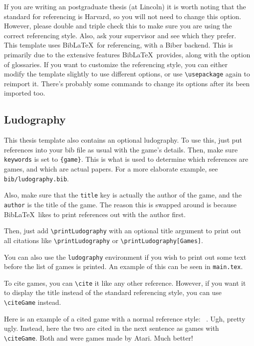 If you are writing an postgraduate thesis (at Lincoln) it is worth noting that the standard for referencing is Harvard, so you will not need to change this option. However, please double and triple check this to make sure you are using the correct referencing style. Also, ask your supervisor and see which they prefer. This template uses Bib\LaTeX~for referencing, with a Biber backend. This is primarily due to the extensive features Bib\LaTeX~provides, along with the option of glossaries. If you want to customize the referencing style, you can either modify the template slightly to use different options, or use \texttt{\textbackslash usepackage} again to reimport it. There's probably some commands to change its options after its been imported too.

\subsection{Ludography}
This thesis template also contains an optional ludography. To use this, just put references into your bib file as usual with the game's details. Then, make sure \texttt{keywords} is set to \texttt{\{game\}}. This is what is used to determine which references are games, and which are actual papers. For a more elaborate example, see \texttt{bib/ludography.bib}.

Also, make sure that the \texttt{title} key is actually the author of the game, and the \texttt{author} is the title of the game. The reason this is swapped around is because Bib\LaTeX~likes to print references out with the author first.

Then, just add \texttt{\textbackslash printLudography} with an optional title argument to print out all citations like \texttt{\textbackslash printLudography} or \texttt{\textbackslash printLudography[Games]}.

You can also use the \texttt{ludography} environment if you wish to print out some text before the list of games is printed. An example of this can be seen in \texttt{main.tex}.

To cite games, you can \texttt{\textbackslash cite} it like any other reference. However, if you want it to display the title instead of the standard referencing style, you can use \texttt{\textbackslash citeGame} instead.

Here is an example of a cited game with a normal reference style: ~\cite{spaceinvaders}. Ugh, pretty ugly. Instead, here the two are  cited in the next sentence as games with \texttt{\textbackslash citeGame}. Both  and  were games made by Atari. Much better!